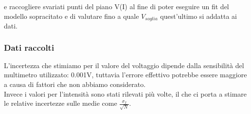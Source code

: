 \documentclass[a4paper]{article}
\theoremstyle{definition}
\begin{document}
\noindent e raccogliere svariati punti del piano V(I) al fine di poter eseguire un fit del modello sopracitato e di valutare fino a quale \(V_{soglia}\) quest'ultimo si addatta ai dati.

\subsubsection*{Dati raccolti}
L'incertezza che stimiamo per il valore del voltaggio dipende dalla sensibilità del multimetro utilizzato: 0.001V, tuttavia l'errore effettivo potrebbe essere maggiore a causa di fattori che non abbiamo considerato.\\
Invece i valori per l'intensità sono stati rilevati più volte, il che ci porta a stimare le relative incertezze sulle medie come \(\frac{\sigma_{I}}{\sqrt{N}}\).

\pagebreak
\end{document}
